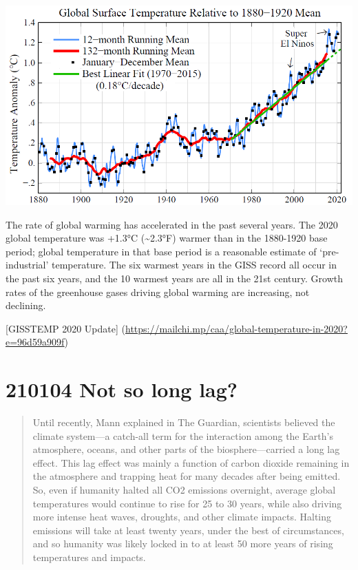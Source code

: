 \documentclass[
]{book}
\begin{document}
\includegraphics{fig/Global_Temperature_1880-2020.png}

The rate of global warming has accelerated in the past several years. The 2020 global temperature was +1.3°C (\textasciitilde2.3°F) warmer than in the 1880-1920 base period; global temperature in that base period is a reasonable estimate of `pre-industrial' temperature. The six warmest years in the GISS record all occur in the past six years, and the 10 warmest years are all in the 21st century. Growth rates of the greenhouse gases driving global warming are increasing, not declining.

{[}GISSTEMP 2020 Update{]} (\url{https://mailchi.mp/caa/global-temperature-in-2020?e=96d59a909f})

\hypertarget{not-so-long-lag}{%
\section{210104 Not so long lag?}\label{not-so-long-lag}}

\begin{quote}
Until recently, Mann explained in The Guardian, scientists believed the climate system---a catch-all term for the interaction among the Earth's atmosphere, oceans, and other parts of the biosphere---carried a long lag effect. This lag effect was mainly a function of carbon dioxide remaining in the atmosphere and trapping heat for many decades after being emitted. So, even if humanity halted all CO2 emissions overnight, average global temperatures would continue to rise for 25 to 30 years, while also driving more intense heat waves, droughts, and other climate impacts. Halting emissions will take at least twenty years, under the best of circumstances, and so humanity was likely locked in to at least 50 more years of rising temperatures and impacts.
\end{quote}
\end{document}
